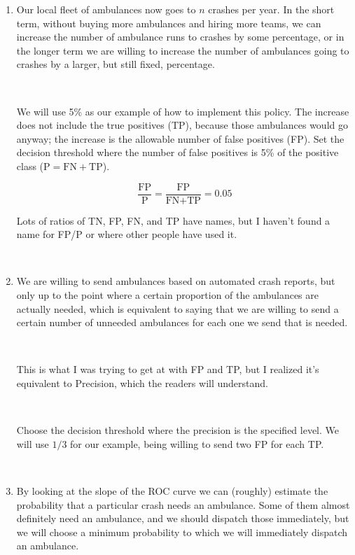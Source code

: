 \begin{enumerate}
	\item Our local fleet of ambulances now goes to $n$ crashes per year.  In the short term, without buying more ambulances and hiring more teams, we can increase the number of ambulance runs to crashes by some percentage, or in the longer term we are willing to increase the number of ambulances going to crashes by a larger, but still fixed, percentage.  
	
	\
	
	We will use 5\% as our example of how to implement this policy.  The increase does not include the true positives (TP), because those ambulances would go anyway; the increase is the allowable number of false positives (FP).  Set the decision threshold where the number of false positives is 5\% of the positive class ($\text{P} = \text{FN} + \text{TP}$).   

$$\frac{\text{FP}}{\text{P}} =  \frac{\text{FP}}{\text{FN} + \text{TP}} = 0.05  $$

Lots of ratios of TN, FP, FN, and TP have names, but I haven't found a name for FP/P or where other people have used it.  

\

	
	\item We are willing to send ambulances based on automated crash reports, but only up to the point where a certain proportion of the ambulances are actually needed, which is equivalent to saying that we are willing to send a certain number of unneeded ambulances for each one we send that is needed.  
	
	\
	
	This is what I was trying to get at with FP and TP, but I realized it's equivalent to Precision, which the readers will understand.  
	
	\
	
	Choose the decision threshold where the precision is the specified level.  We will use $1/3$ for our example, being willing to send two FP for each TP.  
	
	\
	
	\item By looking at the slope of the ROC curve we can (roughly) estimate the probability that a particular crash needs an ambulance.  Some of them almost definitely need an ambulance, and we should dispatch those immediately, but we will choose a minimum probability to which we will immediately dispatch an ambulance.  
	
	\
	

\end{enumerate}
